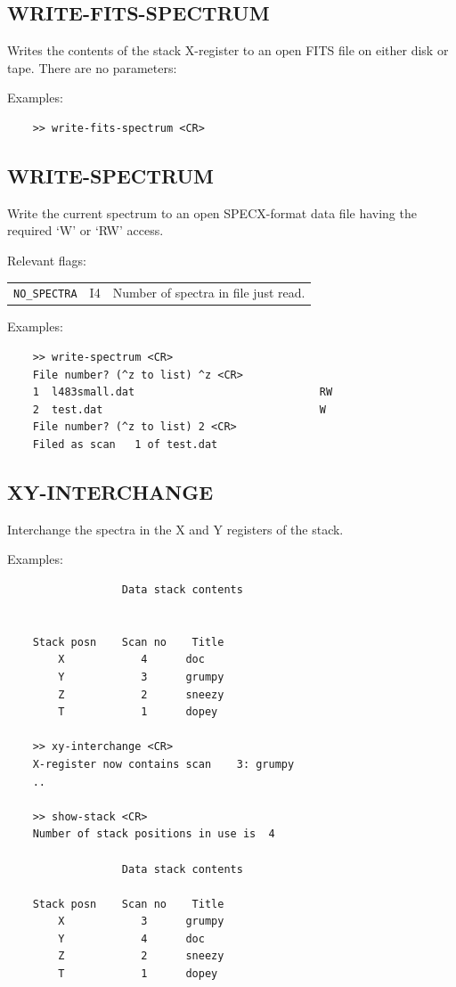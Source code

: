 \documentclass[11pt,twoside]{report}
\begin{document}
\subsection{WRITE-FITS-SPECTRUM} 

Writes the contents of the stack X-register to an open FITS file on
either disk or tape. There are no parameters:

Examples:
\begin{verbatim}
    >> write-fits-spectrum <CR>
\end{verbatim}

\subsection{WRITE-SPECTRUM} 

Write the current spectrum to an open  SPECX-format data file having the
required `W' or `RW' access.

Relevant flags:\\
\begin{tabular}{lll}
  \verb+NO_SPECTRA+ & I4 & Number of spectra in file just read.
\end{tabular}

Examples:
\begin{verbatim}
    >> write-spectrum <CR>
    File number? (^z to list) ^z <CR>
    1  l483small.dat                             RW
    2  test.dat                                  W 
    File number? (^z to list) 2 <CR>
    Filed as scan   1 of test.dat                                
\end{verbatim}

\subsection{XY-INTERCHANGE} 

Interchange the spectra in the X and Y registers of the stack.

Examples:
\begin{verbatim}
                  Data stack contents


    Stack posn    Scan no    Title
        X            4      doc                       
        Y            3      grumpy                    
        Z            2      sneezy                    
        T            1      dopey                     

    >> xy-interchange <CR>
    X-register now contains scan    3: grumpy
    ..

    >> show-stack <CR>
    Number of stack positions in use is  4

                  Data stack contents

    Stack posn    Scan no    Title
        X            3      grumpy                    
        Y            4      doc                       
        Z            2      sneezy                    
        T            1      dopey                     
\end{verbatim}
\end{document}
